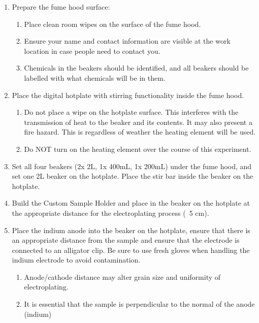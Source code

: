 \begin{tcolorbox}
    \begin{enumerate}
        \item Prepare the fume hood surface:
        \begin{enumerate}
            \item Place clean room wipes on the surface of the fume hood.
            \item Ensure your name and contact information are visible at the work location in case people need to contact you.
            \item Chemicals in the beakers should be identified, and all beakers should be labelled with what chemicals will be in them.
        \end{enumerate}
        \item Place the digital hotplate with stirring functionality inside the fume hood.
        \begin{enumerate}
            \item Do not place a wipe on the hotplate surface. This interferes with the transmission of heat to the beaker and its contents. It may also present a fire hazard. This is regardless of weather the heating element will be used.
            \item Do NOT turn on the heating element over the course of this experiment.
        \end{enumerate}
        \item Set all four beakers (2x 2L, 1x 400mL, 1x 200mL) under the fume hood, and set one 2L beaker on the hotplate. Place the stir bar inside the beaker on the hotplate.
        \item Build the Custom Sample Holder and place in the beaker on the hotplate at the appropriate distance for the electroplating process (~5 cm).
        \item Place the indium anode into the beaker on the hotplate, ensure that there is an appropriate distance from the sample and ensure that the electrode is connected to an alligator clip. Be sure to use fresh gloves when handling the indium electrode to avoid contamination.
        \begin{enumerate}
            \item Anode/cathode distance may alter grain size and uniformity of electroplating.
            \item It is essential that the sample is perpendicular to the normal of the anode (indium)
        \end{enumerate}


\end{enumerate}
\end{tcolorbox}

